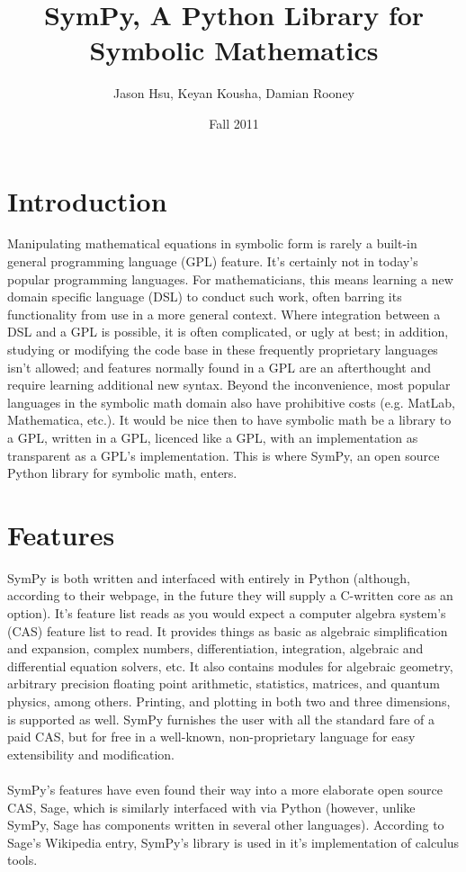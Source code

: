 \documentclass[11pt,a4paper,oneside]{report}
\begin{document}
\title{SymPy, A Python Library for Symbolic Mathematics}
\author{Jason Hsu, Keyan Kousha, Damian Rooney}
\date{Fall 2011}
\maketitle
\section*{Introduction}
Manipulating mathematical equations in symbolic form is rarely a built-in general programming language (GPL) feature. It's certainly not in today's popular programming languages. For mathematicians, this means learning a new domain specific language (DSL) to conduct such work, often barring its functionality from use in a more general context. Where integration between a DSL and a GPL is possible, it is often complicated, or ugly at best; in addition, studying or modifying the code base in these frequently proprietary languages isn't allowed; and features normally found in a GPL are an afterthought and require learning additional new syntax. Beyond the inconvenience, most popular languages in the symbolic math domain also have prohibitive costs (e.g. MatLab, Mathematica, etc.). It would be nice then to have symbolic math be a library to a GPL, written in a GPL, licenced like a GPL, with an implementation as transparent as a GPL's implementation. This is where SymPy, an open source Python library for symbolic math, enters.
\section*{Features}
SymPy is both written and interfaced with entirely in Python (although, according to their webpage, in the future they will supply a C-written core as an option). It's feature list reads as you would expect a computer algebra system's (CAS) feature list to read. It provides things as basic as algebraic simplification and expansion, complex numbers, differentiation, integration, algebraic and differential equation solvers, etc. It also contains modules for algebraic geometry, arbitrary precision floating point arithmetic, statistics, matrices, and quantum physics, among others. Printing, and plotting in both two and three dimensions, is supported as well. SymPy furnishes the user with all the standard fare of a paid CAS, but for free in a well-known, non-proprietary language for easy extensibility and modification.\\\\
 SymPy's features have even found their way into a more elaborate open source CAS, Sage, which is similarly interfaced with via Python (however, unlike SymPy, Sage has components written in several other languages). According to Sage's Wikipedia entry, SymPy's library is used in it's implementation of calculus tools.
\end{document}

